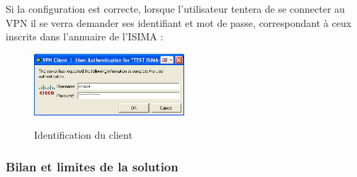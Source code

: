Si la configuration est correcte, lorsque l'utilisateur tentera de se connecter au VPN il se verra demander ses identifiant et mot de passe, correspondant à ceux inscrits dans l'annuaire de l'ISIMA :

\begin{figure}[H]
	\begin{center}
		\includegraphics[width=0.5\textwidth]{partie_2/screen_windows/fenetre_connexion.PNG}\\
	\end{center}
	\caption{Identification du client}
	\label{VPN_CISCO_CLIENT}
\end{figure}

\subsubsection{Bilan et limites de la solution}

